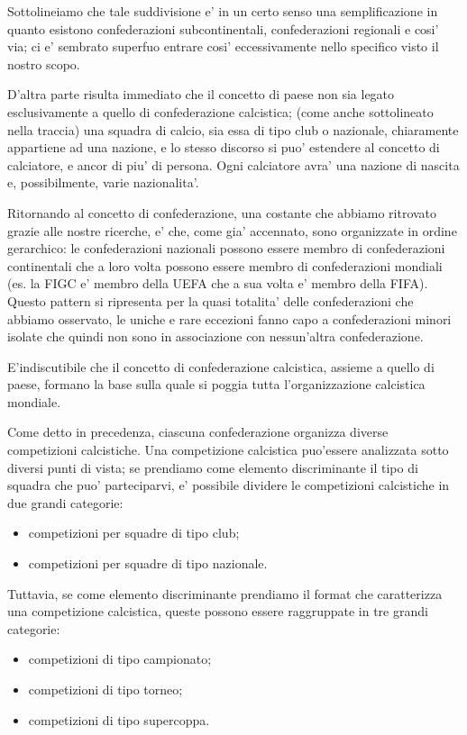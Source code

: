 Sottolineiamo che tale suddivisione e' in un certo senso una semplificazione in quanto
esistono confederazioni subcontinentali, confederazioni regionali e cosi' via; ci e' sembrato
superfuo entrare cosi' eccessivamente nello specifico visto il nostro scopo.

D'altra parte risulta immediato che il concetto di paese non sia legato esclusivamente a quello
di confederazione calcistica; (come anche sottolineato nella traccia) una squadra di calcio,
sia essa di tipo club o nazionale, chiaramente appartiene ad una nazione, e lo stesso discorso
si puo' estendere al concetto di calciatore, e ancor di piu' di persona.
Ogni calciatore avra' una nazione di nascita e, possibilmente, varie nazionalita'.

Ritornando al concetto di confederazione, una costante che abbiamo ritrovato grazie alle nostre
ricerche, e' che, come gia' accennato, sono organizzate in ordine gerarchico: le confederazioni
nazionali possono essere membro di confederazioni continentali che a loro volta possono essere
membro di confederazioni mondiali (es. la FIGC e' membro della UEFA che a sua volta e' membro
della FIFA).
Questo pattern si ripresenta per la quasi totalita' delle confederazioni che abbiamo osservato,
le uniche e rare eccezioni fanno capo a confederazioni minori isolate che quindi non sono in
associazione con nessun'altra confederazione.

E'indiscutibile che il concetto di confederazione calcistica, assieme a quello di paese,
formano la base sulla quale si poggia tutta l'organizzazione calcistica mondiale.

\bigskip
\bigskip

Come detto in precedenza, ciascuna confederazione organizza diverse competizioni calcistiche.
Una competizione calcistica puo'essere analizzata sotto diversi punti di vista;
se prendiamo come elemento discriminante il tipo di squadra che puo' parteciparvi, e' possibile
dividere le competizioni calcistiche in due grandi categorie:
\begin{itemize}
	\item competizioni per squadre di tipo club;
	\item competizioni per squadre di tipo nazionale.
\end{itemize}

Tuttavia, se come elemento discriminante prendiamo il format che caratterizza una competizione
calcistica, queste possono essere raggruppate in tre grandi categorie:
\begin{itemize}
	\item competizioni di tipo campionato;
	\item competizioni di tipo torneo;
	\item competizioni di tipo supercoppa.
\end{itemize}

